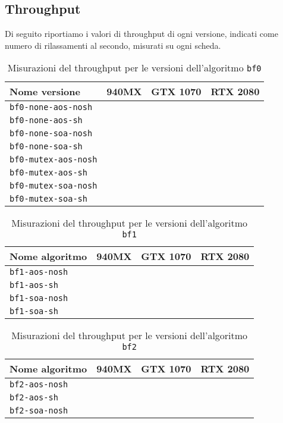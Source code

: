 \documentclass[a4paper]{article}
\begin{document}
	\subsection{Throughput}
	Di seguito riportiamo i valori di throughput di ogni versione, indicati come numero di rilassamenti al secondo, misurati su ogni scheda.
	\begin{table}[!ht]
		\centering
		\begin{tabular}{|l|c|c|c|}
			\hline
			\textbf{Nome versione} & \textbf{940MX} & \textbf{GTX 1070} & \textbf{RTX 2080} \\ \hline
			\texttt{bf0-none-aos-nosh}  &  &  &  \\ \hline
			\texttt{bf0-none-aos-sh}    &  &  &  \\ \hline
			\texttt{bf0-none-soa-nosh}  &  &  &  \\ \hline
			\texttt{bf0-none-soa-sh}    &  &  &  \\ \hline
			\texttt{bf0-mutex-aos-nosh} &  &  &  \\ \hline
			\texttt{bf0-mutex-aos-sh}   &  &  &  \\ \hline
			\texttt{bf0-mutex-soa-nosh} &  &  &  \\ \hline
			\texttt{bf0-mutex-soa-sh}   &  &  &  \\ \hline
		\end{tabular}
		\label{tab:throughput_bf0}
		\caption{Misurazioni del throughput per le versioni dell'algoritmo \texttt{bf0}}
	\end{table}

	\begin{table}[!ht]
		\centering
		\begin{tabular}{|l|c|c|c|}
			\hline
			\textbf{Nome algoritmo} & \textbf{940MX} & \textbf{GTX 1070} & \textbf{RTX 2080} \\ \hline
			\texttt{bf1-aos-nosh}  &  &  &  \\ \hline
			\texttt{bf1-aos-sh}    &  &  &  \\ \hline
			\texttt{bf1-soa-nosh}  &  &  &  \\ \hline
			\texttt{bf1-soa-sh}    &  &  &  \\ \hline
		\end{tabular}
		\label{tab:throughput_bf1}
		\caption{Misurazioni del throughput per le versioni dell'algoritmo \texttt{bf1}}
	\end{table}
	
	\begin{table}[!ht]
		\centering
		\begin{tabular}{|l|c|c|c|}
			\hline
			\textbf{Nome algoritmo} & \textbf{940MX} & \textbf{GTX 1070} & \textbf{RTX 2080} \\ \hline
			\texttt{bf2-aos-nosh}  &  &  &  \\ \hline
			\texttt{bf2-aos-sh}    &  &  &  \\ \hline
			\texttt{bf2-soa-nosh}  &  &  &  \\ \hline
		\end{tabular}
		\label{tab:throughput_bf2}
		\caption{Misurazioni del throughput per le versioni dell'algoritmo \texttt{bf2}}
	\end{table}
	
\end{document}
